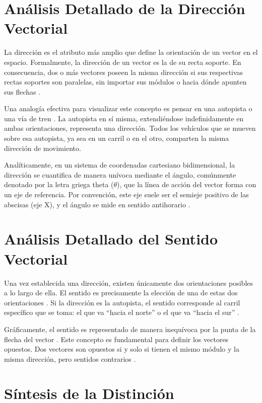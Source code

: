 \documentclass[conference]{IEEEtran}
\begin{document}
\section{Análisis Detallado de la Dirección Vectorial}

La dirección es el atributo más amplio que define la orientación de un vector en el espacio. Formalmente, la dirección de un vector es la de su recta soporte. En consecuencia, dos o más vectores poseen la misma dirección si sus respectivas rectas soportes son paralelas, sin importar sus módulos o hacia dónde apunten sus flechas \cite{superprof_vectores}.

Una analogía efectiva para visualizar este concepto es pensar en una autopista o una vía de tren \cite{openstax2021algebra}. La autopista en sí misma, extendiéndose indefinidamente en ambas orientaciones, representa una dirección. Todos los vehículos que se mueven sobre esa autopista, ya sea en un carril o en el otro, comparten la misma dirección de movimiento.

Analíticamente, en un sistema de coordenadas cartesiano bidimensional, la dirección se cuantifica de manera unívoca mediante el ángulo, comúnmente denotado por la letra griega theta ($\theta$), que la línea de acción del vector forma con un eje de referencia. Por convención, este eje suele ser el semieje positivo de las abscisas (eje X), y el ángulo se mide en sentido antihorario \cite{grossman2012algebra}.

\section{Análisis Detallado del Sentido Vectorial}

Una vez establecida una dirección, existen únicamente dos orientaciones posibles a lo largo de ella. El sentido es precisamente la elección de una de estas dos orientaciones \cite{superprof_vectores}. Si la dirección es la autopista, el sentido corresponde al carril específico que se toma: el que va ``hacia el norte'' o el que va ``hacia el sur'' \cite{fastercapital_direccion}.

Gráficamente, el sentido es representado de manera inequívoca por la punta de la flecha del vector \cite{kolman2006algebra}. Este concepto es fundamental para definir los vectores opuestos. Dos vectores son opuestos si y solo si tienen el mismo módulo y la misma dirección, pero sentidos contrarios \cite{serway2008fisica}.

\section{Síntesis de la Distinción}
\end{document}
